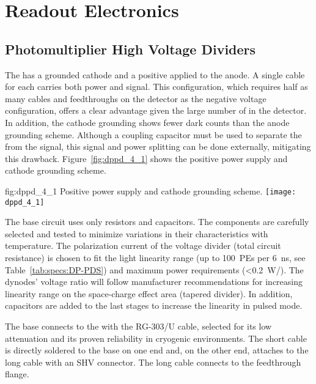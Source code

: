 \section{Readout Electronics}
\label{sec:dp-pds-electronics}

\subsection{Photomultiplier High Voltage Dividers}
\label{sec:fddp-pd-4.1}

The  has a grounded cathode and a positive  applied to the anode. A single cable for each  carries both power and signal. This configuration, which requires half as many cables and feedthroughs on the detector as the negative voltage configuration, offers a clear advantage given the large number of  in the detector. In addition, the cathode grounding shows fewer dark counts than the anode grounding scheme. Although a coupling capacitor must be used to separate the  from the  signal, this signal and power splitting can be done externally, mitigating this drawback.  Figure~\ref{fig:dppd_4_1} shows the positive power supply and cathode grounding scheme.

\begin{dunefigure}{fig:dppd_4_1}
{Positive power supply and cathode grounding scheme.}
\texttt{[image: dppd\_4\_1]}
\end{dunefigure}

The  base circuit uses only resistors and capacitors. The components are carefully selected and tested to minimize variations in their characteristics with temperature. The polarization current of the voltage divider (total circuit resistance) is chosen to fit the  light linearity range (up to \SI{100}{PEs} per \SI{6}{\ns}, see Table~\ref{tab:specs:DP-PDS}) and maximum power requirements (\SI{<0.2}{W/}). The dynodes' voltage ratio will follow manufacturer recommendations for increasing linearity range on the space-charge effect area (tapered divider). In addition, capacitors are added to the last stages  to increase the  linearity in pulsed mode.

The  base connects to the \fdth with the RG-303/U cable, selected for its low attenuation and its proven reliability in cryogenic environments. The short cable is directly soldered to the  base on one end and, on the other end, attaches to the long  cable with an SHV connector. The long cable connects to the feedthrough flange.


